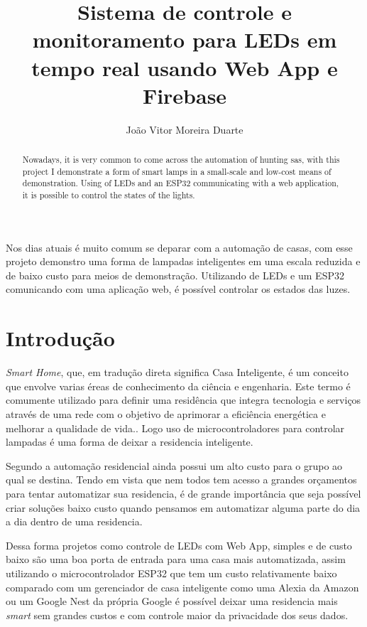 \documentclass[12pt]{article}
\title{Sistema de controle e monitoramento para LEDs em tempo real usando Web App e Firebase}
\author{João Vitor Moreira Duarte }
\begin{document}
\maketitle
\begin{abstract}
  Nowadays, it is very common to come across the automation of hunting
  sas, with this project I demonstrate a form of smart lamps in a
  small-scale and low-cost means of demonstration. Using of
  LEDs and an ESP32 communicating with a web application, it is possible to control
  the states of the lights.
\end{abstract}
\begin{resumo}
  Nos dias atuais é muito comum se deparar com a automação de casas, com esse projeto demonstro uma forma
  de lampadas inteligentes em uma escala reduzida e de baixo custo para meios de demonstração. Utilizando de LEDs
  e um ESP32 comunicando com uma aplicação web, é possível controlar os estados das luzes.
\end{resumo}

\section{Introdução}

\emph{Smart Home}, que, em tradução direta significa Casa Inteligente, é um conceito
que envolve varias éreas de conhecimento da ciência e engenharia. Este termo é
comumente utilizado para definir uma residência que integra tecnologia e serviços através de
uma rede com o objetivo de aprimorar a eficiência energética e melhorar a qualidade de vida.\cite{MULANI}.
Logo uso de microcontroladores para controlar lampadas é uma forma de deixar a residencia inteligente.

Segundo \cite{ALMEIDA} a automação residencial ainda possui um alto custo para o
grupo ao qual se destina. Tendo em vista que nem todos tem acesso a grandes orçamentos para tentar automatizar sua residencia,
é de grande importância que seja possível criar soluções baixo custo quando pensamos em automatizar alguma parte do dia a dia dentro de uma residencia.

Dessa forma projetos como controle de LEDs com Web App, simples e de custo baixo são uma boa porta de entrada para uma casa mais automatizada,
assim utilizando o microcontrolador ESP32 que tem um custo relativamente baixo comparado com um gerenciador de casa inteligente como uma Alexia da
Amazon ou um Google Nest da própria Google é possível deixar uma residencia mais \emph{smart} sem grandes custos e com controle maior da privacidade dos seus dados.
\end{document}
